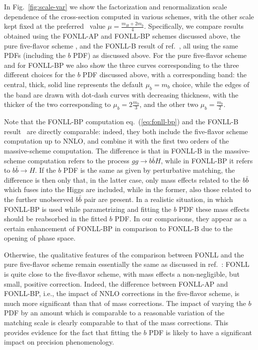 In Fig.~\ref{fig:scale-var} we show the factorization and
renormalization scale dependence of the cross-section computed in
various schemes, with the other scale kept fixed at the
preferred~\cite{Forte:2015hba,Forte:2016sja} value
$\mu=\frac{m_H+2m_b}{4}$.
Specifically, we compare results obtained using the FONLL-AP and
FONLL-BP schemes discussed above, the pure five-flavor scheme , and
the FONLL-B result of ref.~\cite{Forte:2016sja}, all using the same
PDFs (including the $b$ PDF) as discussed above. For the pure
five-flavor scheme and for FONLL-BP we also show
the three curves corresponding to the three different choices for the
$b$ PDF discussed above, with a corresponding band:
the central, thick, solid line represents the default $\mu_b=m_b$
choice, while the edges of the band are drawn with dot-dash curves
with decreasing thickness, with the thicker of the two corresponding
to $\mu_b=2\frac{m_b}{3}$, and the other two $\mu_b=\frac{m_b}{2}$.

Note that the
FONLL-BP computation eq.~(\ref{eq:fonll-bp}) and the FONLL-B
result~\cite{Forte:2016sja} are directly comparable: indeed, they both
include the five-flavor scheme computation up to NNLO, and combine it
with the first
two orders of the massive-scheme computation. The difference is that
in FONLL-B in the massive-scheme computation refers to the process
$gg\to b\bar b H$, while in FONLL-BP it refers to  $b\bar b \to H$. If
the $b$ PDF is the same as given by perturbative matching, the
difference is then only that, in the latter case, only mass effects
related to the $b\bar b$ which fuses into the Higgs are included,
while in the former, also those related to the further unobserved
$b\bar b$ pair are present. In a realistic situation, in which FONLL-BP is used
while parametrizing and fitting the $b$ PDF these mass effects should
be reabsorbed in the fitted $b$ PDF. In our comparisons, they 
appear as a certain enhancement of FONLL-BP in comparison to FONLL-B
due to the opening of phase space. 


Otherwise, the qualitative features of the comparison between FONLL
and the pure five-flavor scheme remain essentially the same as discussed
in ref.~\cite{Forte:2016sja}: FONLL is quite close to the
five-flavor scheme, with mass effects a non-negligible, but small,
positive correction. Indeed, the difference between
FONLL-AP and FONLL-BP, i.e., the impact of NNLO corrections in the
five-flavor scheme, is much more significant than that of mass corrections.
The impact of varying the $b$ PDF by
an amount which is comparable to a reasonable variation of the
matching scale is clearly comparable to that of the mass
corrections. This provides evidence for the fact that fitting the $b$
PDF is likely to have a significant impact on precision phenomenology.


